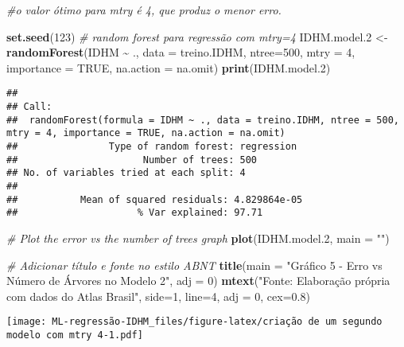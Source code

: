 \documentclass[
]{article}
\newenvironment{Shaded}{\begin{snugshade}}{\end{snugshade}}
\newcommand{\AttributeTok}[1]{\textcolor[rgb]{0.13,0.29,0.53}{#1}}
\newcommand{\CommentTok}[1]{\textcolor[rgb]{0.56,0.35,0.01}{\textit{#1}}}
\newcommand{\ConstantTok}[1]{\textcolor[rgb]{0.56,0.35,0.01}{#1}}
\newcommand{\DecValTok}[1]{\textcolor[rgb]{0.00,0.00,0.81}{#1}}
\newcommand{\FloatTok}[1]{\textcolor[rgb]{0.00,0.00,0.81}{#1}}
\newcommand{\FunctionTok}[1]{\textcolor[rgb]{0.13,0.29,0.53}{\textbf{#1}}}
\newcommand{\NormalTok}[1]{#1}
\newcommand{\OtherTok}[1]{\textcolor[rgb]{0.56,0.35,0.01}{#1}}
\newcommand{\SpecialCharTok}[1]{\textcolor[rgb]{0.81,0.36,0.00}{\textbf{#1}}}
\newcommand{\StringTok}[1]{\textcolor[rgb]{0.31,0.60,0.02}{#1}}
\begin{document}
\begin{Shaded}
\begin{Highlighting}[]
\CommentTok{\#o valor ótimo para mtry é 4, que produz o menor erro.}

\FunctionTok{set.seed}\NormalTok{(}\DecValTok{123}\NormalTok{)}
\CommentTok{\# random forest para regressão com mtry=4}
\NormalTok{IDHM.model}\FloatTok{.2} \OtherTok{\textless{}{-}} \FunctionTok{randomForest}\NormalTok{(IDHM }\SpecialCharTok{\textasciitilde{}}\NormalTok{ ., }\AttributeTok{data =}\NormalTok{ treino.IDHM, }\AttributeTok{ntree=}\DecValTok{500}\NormalTok{, }\AttributeTok{mtry =} \DecValTok{4}\NormalTok{, }
                         \AttributeTok{importance =} \ConstantTok{TRUE}\NormalTok{, }\AttributeTok{na.action =}\NormalTok{ na.omit) }
\FunctionTok{print}\NormalTok{(IDHM.model}\FloatTok{.2}\NormalTok{) }
\end{Highlighting}
\end{Shaded}

\begin{verbatim}
## 
## Call:
##  randomForest(formula = IDHM ~ ., data = treino.IDHM, ntree = 500,      mtry = 4, importance = TRUE, na.action = na.omit) 
##                Type of random forest: regression
##                      Number of trees: 500
## No. of variables tried at each split: 4
## 
##           Mean of squared residuals: 4.829864e-05
##                     % Var explained: 97.71
\end{verbatim}

\begin{Shaded}
\begin{Highlighting}[]
\CommentTok{\# Plot the error vs the number of trees graph }
\FunctionTok{plot}\NormalTok{(IDHM.model}\FloatTok{.2}\NormalTok{, }\AttributeTok{main =} \StringTok{""}\NormalTok{)}

\CommentTok{\# Adicionar título e fonte no estilo ABNT}
\FunctionTok{title}\NormalTok{(}\AttributeTok{main =} \StringTok{"Gráfico 5 {-} Erro vs Número de Árvores no Modelo 2"}\NormalTok{, }\AttributeTok{adj =} \DecValTok{0}\NormalTok{)}
\FunctionTok{mtext}\NormalTok{(}\StringTok{"Fonte: Elaboração própria com dados do Atlas Brasil"}\NormalTok{, }\AttributeTok{side=}\DecValTok{1}\NormalTok{, }\AttributeTok{line=}\DecValTok{4}\NormalTok{, }\AttributeTok{adj =} \DecValTok{0}\NormalTok{, }\AttributeTok{cex=}\FloatTok{0.8}\NormalTok{)}
\end{Highlighting}
\end{Shaded}

\texttt{[image: ML-regressão-IDHM\_files/figure-latex/criação de um segundo modelo com mtry 4-1.pdf]}
\end{document}
